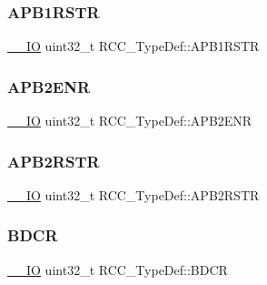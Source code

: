 \mbox{\label{struct_r_c_c___type_def_a600f4d6d592f43edb2fc653c5cba023a}} 
\subsubsection{\texorpdfstring{APB1RSTR}{APB1RSTR}}
{\footnotesize\ttfamily \mbox{\hyperlink{group___c_m_s_i_s___c_m3__core__definitions_gaec43007d9998a0a0e01faede4133d6be}{\+\_\+\+\_\+\+IO}} uint32\+\_\+t R\+C\+C\+\_\+\+Type\+Def\+::\+A\+P\+B1\+R\+S\+TR}

\mbox{\label{struct_r_c_c___type_def_a619b4c22f630a269dfd0c331f90f6868}} 
\subsubsection{\texorpdfstring{APB2ENR}{APB2ENR}}
{\footnotesize\ttfamily \mbox{\hyperlink{group___c_m_s_i_s___c_m3__core__definitions_gaec43007d9998a0a0e01faede4133d6be}{\+\_\+\+\_\+\+IO}} uint32\+\_\+t R\+C\+C\+\_\+\+Type\+Def\+::\+A\+P\+B2\+E\+NR}

\mbox{\label{struct_r_c_c___type_def_a4491ab20a44b70bf7abd247791676a59}} 
\subsubsection{\texorpdfstring{APB2RSTR}{APB2RSTR}}
{\footnotesize\ttfamily \mbox{\hyperlink{group___c_m_s_i_s___c_m3__core__definitions_gaec43007d9998a0a0e01faede4133d6be}{\+\_\+\+\_\+\+IO}} uint32\+\_\+t R\+C\+C\+\_\+\+Type\+Def\+::\+A\+P\+B2\+R\+S\+TR}

\mbox{\label{struct_r_c_c___type_def_a05be375db50e8c9dd24fb3bcf42d7cf1}} 
\subsubsection{\texorpdfstring{BDCR}{BDCR}}
{\footnotesize\ttfamily \mbox{\hyperlink{group___c_m_s_i_s___c_m3__core__definitions_gaec43007d9998a0a0e01faede4133d6be}{\+\_\+\+\_\+\+IO}} uint32\+\_\+t R\+C\+C\+\_\+\+Type\+Def\+::\+B\+D\+CR}

